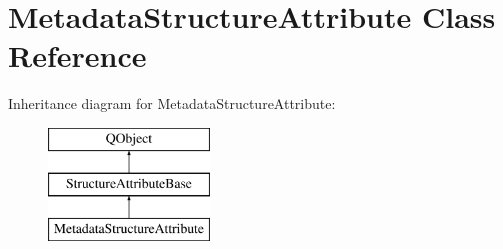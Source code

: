 \hypertarget{class_metadata_structure_attribute}{}\section{Metadata\+Structure\+Attribute Class Reference}
\label{class_metadata_structure_attribute}
Inheritance diagram for Metadata\+Structure\+Attribute\+:\begin{figure}[H]
\begin{center}
\leavevmode
\includegraphics[height=3.000000cm]{class_metadata_structure_attribute}
\end{center}
\end{figure}

